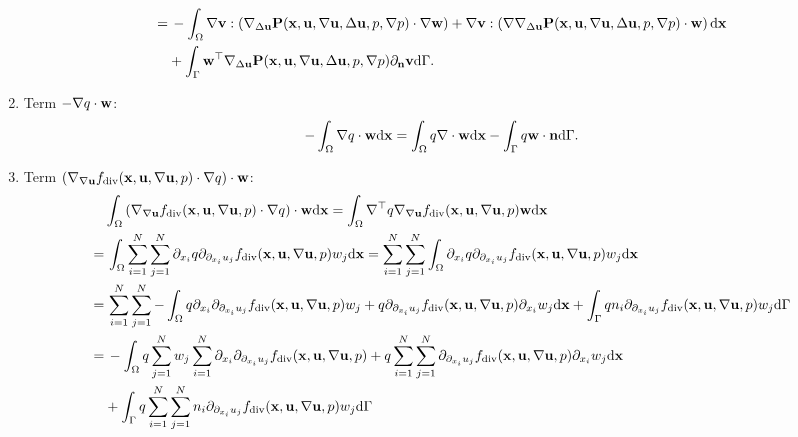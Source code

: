 \documentclass[oneside,11pt]{book}
\numberwithin{equation}{section}
\begin{document}
\begin{enumerate}[leftmargin=0in]
\begin{align*}
        =&\, -\int_\Omega \nabla{\bf v}:\left(\nabla_{\Delta{\bf u}}{\bf P}({\bf x},{\bf u},\nabla{\bf u},\Delta{\bf u},p,\nabla p)\cdot\nabla{\bf w}\right) + \nabla{\bf v}:\left(\nabla\nabla_{\Delta{\bf u}}{\bf P}({\bf x},{\bf u},\nabla{\bf u},\Delta{\bf u},p,\nabla p)\cdot{\bf w}\right){\rm d}{\bf x}\\
        &+ \int_\Gamma {\bf w}^\top\nabla_{\Delta{\bf u}}{\bf P}({\bf x},{\bf u},\nabla{\bf u},\Delta{\bf u},p,\nabla p)\partial_{\bf n}{\bf v}{\rm d}\Gamma.
    \end{align*}
    \item Term $-\nabla q\cdot{\bf w}$:
    \begin{align*}
        -\int_\Omega \nabla q\cdot{\bf w}{\rm d}{\bf x} = \int_\Omega q\nabla\cdot{\bf w}{\rm d}{\bf x} - \int_\Gamma q{\bf w}\cdot{\bf n}{\rm d}\Gamma.
    \end{align*}
    \item Term $\left(\nabla_{\nabla{\bf u}}f_{\rm div}({\bf x},{\bf u},\nabla{\bf u},p)\cdot\nabla q\right)\cdot{\bf w}$:
    \begin{align*}
        &\int_\Omega \left(\nabla_{\nabla{\bf u}}f_{\rm div}({\bf x},{\bf u},\nabla{\bf u},p)\cdot\nabla q\right)\cdot{\bf w}{\rm d}{\bf x} = \int_\Omega \nabla^\top q\nabla_{\nabla{\bf u}}f_{\rm div}({\bf x},{\bf u},\nabla{\bf u},p){\bf w}{\rm d}{\bf x}\\
        =&\, \int_\Omega \sum_{i=1}^N\sum_{j=1}^N \partial_{x_i}q\partial_{\partial_{x_i}u_j}f_{\rm div}({\bf x},{\bf u},\nabla{\bf u},p)w_j{\rm d}{\bf x} = \sum_{i=1}^N\sum_{j=1}^N \int_\Omega \partial_{x_i}q\partial_{\partial_{x_i}u_j}f_{\rm div}({\bf x},{\bf u},\nabla{\bf u},p)w_j{\rm d}{\bf x}\\
        =&\, \sum_{i=1}^N\sum_{j=1}^N -\int_\Omega q\partial_{x_i}\partial_{\partial_{x_i}u_j}f_{\rm div}({\bf x},{\bf u},\nabla{\bf u},p)w_j + q\partial_{\partial_{x_i}u_j}f_{\rm div}({\bf x},{\bf u},\nabla{\bf u},p)\partial_{x_i}w_j{\rm d}{\bf x} + \int_\Gamma qn_i\partial_{\partial_{x_i}u_j}f_{\rm div}({\bf x},{\bf u},\nabla{\bf u},p)w_j{\rm d}\Gamma\\
        =&\, -\int_\Omega q\sum_{j=1}^N w_j\sum_{i=1}^N \partial_{x_i}\partial_{\partial_{x_i}u_j}f_{\rm div}({\bf x},{\bf u},\nabla{\bf u},p) + q\sum_{i=1}^N\sum_{j=1}^N \partial_{\partial_{x_i}u_j}f_{\rm div}({\bf x},{\bf u},\nabla{\bf u},p)\partial_{x_i}w_j{\rm d}{\bf x}\\
        &+ \int_\Gamma q\sum_{i=1}^N\sum_{j=1}^N n_i\partial_{\partial_{x_i}u_j}f_{\rm div}({\bf x},{\bf u},\nabla{\bf u},p)w_j{\rm d}\Gamma\\

\end{align*}
\end{enumerate}
\end{document}
